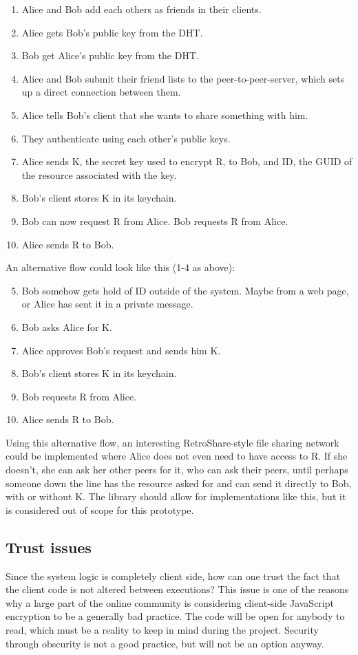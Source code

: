 \begin{enumerate}
  \item Alice and Bob add each others as friends in their clients.
  \item Alice gets Bob’s public key from the DHT.
  \item Bob get Alice’s public key from the DHT. 
  \item Alice and Bob submit their friend lists to the peer-to-peer-server, which sets up a direct connection between them.
  \item Alice tells Bob’s client that she wants to share something with him.
  \item They authenticate using each other’s public keys.
  \item Alice sends K, the secret key used to encrypt R, to Bob, and ID, the GUID of the resource associated with the key.
  \item Bob’s client stores K in its keychain.
 \item Bob can now request R from Alice. Bob requests R from Alice.
 \item Alice sends R to Bob.
\end{enumerate}

An alternative flow could look like this (1-4 as above):
\begin{enumerate}
\setcounter{enumi}{4}
\item Bob somehow gets hold of ID outside of the system. Maybe from a web page, or Alice has sent it in a private message.
\item Bob asks Alice for K.
\item Alice approves Bob’s request and sends him K.
\item Bob’s client stores K in its keychain.
\item Bob requests R from Alice.
\item Alice sends R to Bob.
\end{enumerate}
Using this alternative flow, an interesting RetroShare-style file sharing network could be implemented where Alice does not even need to have access to R. If she doesn’t, she can ask her other peers for it, who can ask their peers, until perhaps someone down the line has the resource asked for and can send it directly to Bob, with or without K. The library should allow for implementations like this, but it is considered out of scope for this prototype.
\subsection{Trust issues}
Since the system logic is completely client side, how can one trust the fact that the client code is not altered between executions? This issue is one of the reasons why a large part of the online community is considering client-side JavaScript encryption to be a generally bad practice. The code will be open for anybody to read, which must be a reality to keep in mind during the project. Security through obscurity is not a good practice, but will not be an option anyway.

